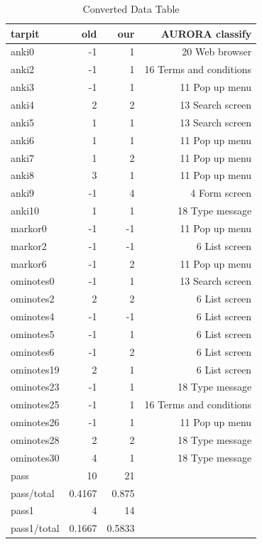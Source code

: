 \documentclass[UTF8, fontset=windows]{article}
\begin{document}
\begin{table}[h]
    \centering
    \begin{tabular}{lrrr}
        \toprule
        tarpit & old & our & AURORA classify \\
        \midrule
        anki0 & -1 & 1 & 20 Web browser \\
        anki2 & -1 & 1 & 16 Terms and conditions \\
        anki3 & -1 & 1 & 11 Pop up menu \\
        anki4 & 2 & 2 & 13 Search screen \\
        anki5 & 1 & 1 & 13 Search screen \\
        anki6 & 1 & 1 & 11 Pop up menu \\
        anki7 & 1 & 2 & 11 Pop up menu \\
        anki8 & 3 & 1 & 11 Pop up menu \\
        anki9 & -1 & 4 & 4 Form screen \\
        anki10 & 1 & 1 & 18 Type message \\
        markor0 & -1 & -1 & 11 Pop up menu \\
        markor2 & -1 & -1 & 6 List screen \\
        markor6 & -1 & 2 & 11 Pop up menu \\
        ominotes0 & -1 & 1 & 13 Search screen \\
        ominotes2 & 2 & 2 & 6 List screen \\
        ominotes4 & -1 & -1 & 6 List screen \\
        ominotes5 & -1 & 1 & 6 List screen \\
        ominotes6 & -1 & 2 & 6 List screen \\
        ominotes19 & 2 & 1 & 6 List screen \\
        ominotes23 & -1 & 1 & 18 Type message \\
        ominotes25 & -1 & 1 & 16 Terms and conditions \\
        ominotes26 & -1 & 1 & 11 Pop up menu \\
        ominotes28 & 2 & 2 & 18 Type message \\
        ominotes30 & 4 & 1 & 18 Type message \\
        \midrule
        pass & 10 & 21 & \\
        pass/total & 0.4167 & 0.875 & \\
        pass1 & 4 & 14 & \\
        pass1/total & 0.1667 & 0.5833 & \\
        \bottomrule
    \end{tabular}
    \caption{Converted Data Table}
    \label{tab:data}
\end{table}
\end{document}
